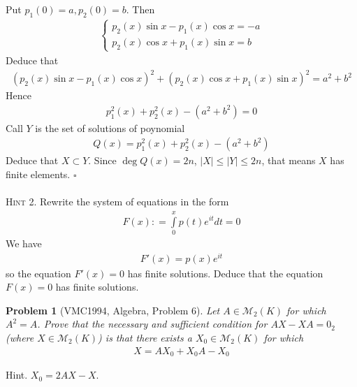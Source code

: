 \documentclass{article}
\newtheorem{problem}{Problem}
\begin{document}
Put ${p_1}\left( 0 \right) = a,{p_2}\left( 0 \right) = b$. Then 
\begin{align}
	\left\{ {\begin{array}{*{20}{c}}
			{{p_2}\left( x \right)\sin x - {p_1}\left( x \right)\cos x =  - a}\\
			{{p_2}\left( x \right)\cos x + {p_1}\left( x \right)\sin x = b}
	\end{array}} \right.
\end{align}
Deduce that
\begin{align}
	{\left( {{p_2}\left( x \right)\sin x - {p_1}\left( x \right)\cos x} \right)^2} + {\left( {{p_2}\left( x \right)\cos x + {p_1}\left( x \right)\sin x} \right)^2} = {a^2} + {b^2}
\end{align}
Hence
\begin{align}
	p_1^2\left( x \right) + p_2^2\left( x \right) - \left( {{a^2} + {b^2}} \right) = 0
\end{align}
Call $Y$ is the set of solutions of poynomial
\begin{align}
	Q\left( x \right) = p_1^2\left( x \right) + p_2^2\left( x \right) - \left( {{a^2} + {b^2}} \right)
\end{align}
Deduce that $X \subset Y$. Since $\deg Q\left( x \right) = 2n$, $\left| X \right| \le \left| Y \right| \le 2n$, that means $X$ has finite elements. \hfill $\square$\\
\\
\textsc{Hint 2.} Rewrite the system of equations in the form
\begin{align}
	F\left( x \right): = \int\limits_0^x {p\left( t \right){e^{it}}dt}  = 0
\end{align}
We have
\begin{align}
	F'\left( x \right) = p\left( x \right){e^{it}}
\end{align}
so the equation $F'\left( x \right) = 0$ has finite solutions. Deduce that the equation $F\left( x \right) = 0$ has finite solutions.

\begin{problem}[VMC1994, Algebra, Problem 6]
	Let $A \in {\mathcal{M}_2}\left( K \right)$ for which $A^2=A$. Prove that the necessary and sufficient condition for $AX-XA=0_2$ (where $X \in {\mathcal{M}_2}\left( K \right)$) is that there exists a $X_0 \in {\mathcal{M}_2}\left( K \right)$ for which
	\begin{align*}
		X = A{X_0} + {X_0}A - {X_0}
	\end{align*}
\end{problem}
{\sf Hint.} ${X_0} = 2AX - X$.
\end{document}
